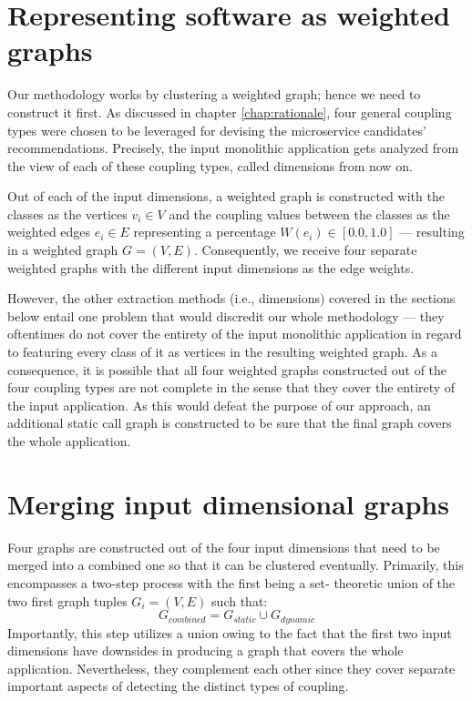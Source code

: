 \documentclass[12pt,a4paper]{report}
\begin{document}
\section{Representing software as weighted graphs} \label{sect:software-as-weighted-graph}

Our methodology works by clustering a weighted graph; hence we need to
construct it first. As discussed in chapter \ref{chap:rationale}, four general
coupling types were chosen to be leveraged for devising the microservice
candidates' recommendations. Precisely, the input monolithic application gets
analyzed from the view of each of these coupling types, called dimensions from
now on.

Out of each of the input dimensions, a weighted graph is constructed with the
classes as the vertices \(v_i \in V\) and the coupling values between the
classes as the weighted edges \(e_i \in E\) representing a percentage \(W(e_i)
\in [0.0, 1.0]\) --- resulting in a weighted graph \(G = (V, E)\).
Consequently, we receive four separate weighted graphs with the different
input dimensions as the edge weights.

However, the other extraction methods (i.e., dimensions) covered in the
sections below entail one problem that would discredit our whole
methodology --- they oftentimes do not cover the entirety of the input
monolithic application in regard to featuring every class of it as vertices in
the resulting weighted graph. As a consequence, it is possible that all four
weighted graphs constructed out of the four coupling types are not complete in
the sense that they cover the entirety of the input application. As this would
defeat the purpose of our approach, an additional static call graph is
constructed to be sure that the final graph covers the whole application.



\section{Merging input dimensional graphs} \label{sect:merging-graphs}

Four graphs are constructed out of the four input dimensions that need
to be merged into a combined one so that it can be clustered eventually.
Primarily, this encompasses a two-step process with the first being a set\hyp
theoretic union of the two first graph tuples \(G_i = (V, E)\) such that:
\[
  G_{combined} = G_{static} \cup G_{dynamic}
\]
Importantly, this step utilizes a
union owing to the fact that the first two input dimensions have downsides in
producing a graph that covers the whole application. Nevertheless, they
complement each other since they cover separate important aspects of detecting
the distinct types of coupling.
\end{document}
